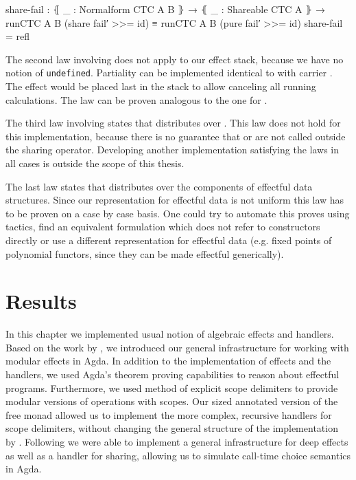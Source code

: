 \begin{code}
share-fail : ⦃ _ : Normalform CTC A B ⦄ → ⦃ _ : Shareable CTC A ⦄ →
  runCTC {A} {B} (share fail′ >>= id) ≡ runCTC {A} {B} (pure fail′ >>= id)
share-fail = refl
\end{code}
The second law involving  does not apply to our effect
stack, because we have no notion of \texttt{undefined}.
Partiality can be implemented identical to  with carrier
.
The effect would be placed last in the stack to allow canceling all running
calculations.
The law can be proven analogous to the one for .

The third law involving  states that 
distributes over .
This law does not hold for this implementation, because there is no guarantee
that  or  are not called outside the sharing
operator.
Developing another implementation satisfying the laws in all cases is outside
the scope of this thesis.

The last law states that  distributes over the components of
effectful data structures.
Since our representation for effectful data is not uniform this law has to be
proven on a case by case basis.
One could try to automate this proves using tactics, find an equivalent
formulation which does not refer to constructors directly or use a different
representation for effectful data (e.g. fixed points of polynomial functors,
since they can be made effectful generically).


\section{Results}
\label{first-order:results}

In this chapter we implemented usual notion of algebraic effects and handlers.
Based on the work by \textcite{DBLP:conf/icfp/Brady13}, we introduced our
general infrastructure for working with modular effects in Agda.
In addition to the implementation of effects and the handlers, we used Agda's
theorem proving capabilities to reason about effectful programs.
Furthermore, we used \textcite{DBLP:conf/haskell/WuSH14} method of explicit
scope delimiters to provide modular versions of operations with scopes.
Our sized annotated version of the free monad allowed us to implement the more
complex, recursive handlers for scope delimiters, without changing the general
structure of the implementation by \textcite{DBLP:conf/haskell/WuSH14}.
Following \textcite{bunkenburg2019modeling} we were able to implement a general
infrastructure for deep effects as well as a handler for sharing, allowing us to
simulate call-time choice semantics in Agda.

